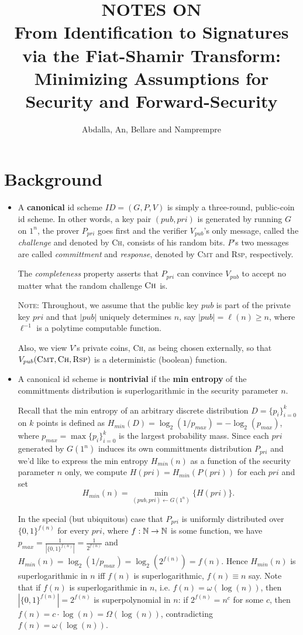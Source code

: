 \documentclass[12pt,twoside]{article}
\title{NOTES ON\\ From Identification to Signatures via the Fiat-Shamir 
Transform: Minimizing Assumptions for Security and Forward-Security}
\author{Abdalla, An, Bellare and Namprempre}
\begin{document}
\maketitle

\section{Background}
\begin{itemize}

\item A {\bf canonical} id scheme $ID = (G,P,V)$ is simply a three-round, 
public-coin id scheme. In other words, a key pair $(pub,pri)$ is generated by
running $G$ on $1^n$, the prover $P_{pri}$ goes 
first and the verifier $V_{pub}$'s only message, called the {\it challenge} 
and denoted by
\textsc{Ch}, consists of his random bits. $P$'s two messages are 
called {\it committment} and {\it response}, denoted by \textsc{Cmt} 
and \textsc{Rsp}, respectively. 

The {\it completeness} property asserts that $P_{pri}$ can convince $V_{pub}$
to accept no matter what the random challenge $\textsc{Ch}$ is.

\textsc{Note}: Throughout, we assume that the public key $pub$ is part
of the private key $pri$ and that $|pub|$ uniquely determines $n$, say 
$|pub| = \ell(n) \geq n$, where $\ell^{-1}$ is a polytime
computable function. 

Also, we view $V$'s 
private coins, \textsc{Ch}, as being chosen externally, so that 
$V_{pub}(\textsc{Cmt},\textsc{Ch},\textsc{Rsp})$ is a deterministic (boolean) 
function.

\item A canonical id scheme is {\bf nontrivial} if the {\bf 
min entropy} of the committments distribution is superlogarithmic in the 
security parameter $n$. 

Recall that the min entropy of an arbitrary discrete distribution 
$D = \{p_i\}_{i=0}^{k}$ on $k$ points is defined as 
$H_{min}(D) = \log_2(1/p_{max}) = -\log_2(p_{max})$, where $p_{max} = \max\{p_i\}_{i=0}^{k}$ is the
largest probability mass. Since each $pri$ generated by $G(1^n)$ induces its 
own committments distribution $P_{pri}$ and we'd like to express the min 
entropy $H_{min}(n)$ as a function of the security parameter $n$ only, we 
compute $H(pri) = H_{min}(P(pri))$ for each $pri$ and set 
\[
H_{min}(n) = \min_{(pub,pri) \gets G(1^n)}\{H(pri)\}.
\]

In the special (but ubiquitous) case that $P_{pri}$ is uniformly distributed over
$\{0,1\}^{f(n)}$ for every $pri$, where $f: \mathbb{N} \to \mathbb{N}$ is some function, 
we have $p_{max} = \frac{1}{|\{0,1\}^{f(n)}|} = \frac{1}{2^{f(n)}}$ and 
$H_{min}(n) = \log_2(1/p_{max}) = \log_2(2^{f(n)}) = f(n)$. Hence
$H_{min}(n)$ is superlogarithmic in $n$ iff $f(n)$ is superlogarithmic, 
$f(n) \equiv n$ say. 
Note that if $f(n)$ is superlogarithmic in $n$, i.e. $f(n) = \omega(\log(n))$, 
then $|\{0,1\}^{f(n)}| = 2^{f(n)}$ is superpolynomial in $n$: if 
$2^{f(n)} = n^c$ for some $c$, then $f(n) = c\cdot\log(n) =
\Omega(\log(n))$, contradicting $f(n) = \omega(\log(n))$. 


\end{itemize}
\end{document}
